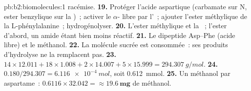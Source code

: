 \begin{solution}{pb:b2:biomolecules:1}
racémise.
\textbf{19.} Protéger l'acide aspartique (carbamate sur N, ester benzylique sur la )~; activer
le $\alpha$- libre par l'~; ajouter l'ester méthylique de la L-phénylalanine~; hydrogénolyser.
\textbf{20.} L'ester méthylique et la ~; l'ester d'abord, un amide étant bien moins réactif.
\textbf{21.} Le dipeptide Asp--Phe (acide libre) et le méthanol.
\textbf{22.} La molécule sucrée est consommée~: ses produits d'hydrolyse ne la remplacent pas.
\textbf{23.} $14 \times 12.011 + 18 \times 1.008 + 2 \times 14.007 + 5 \times 15.999 =
\qty{294.307}{g/mol}$.
\textbf{24.} $0.180/294.307 = \qty{6.116e-4}{mol}$, soit \qty{0.612}{mmol}.
\textbf{25.} Un méthanol par aspartame~: $0.6116 \times 32.042 = \boldsymbol{\approx \qty{19.6}{mg}}$ de
méthanol.
\end{solution}
